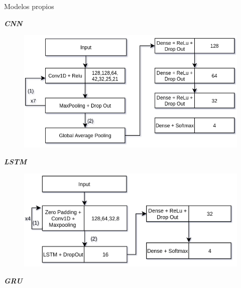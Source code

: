 \begin{frame}{Modelos propios}
\begin{overprint}
        \begin{center}
            {\color{TurkishRose} \textbf{\textit{CNN}}}
        \end{center}
        
        \begin{figure}
            \centering
            \includegraphics[keepaspectratio=true,height=0.65\paperheight,width=0.8\paperwidth]{Images/cnn diagram.png}
        \end{figure}
        
        \begin{center}
            {\color{TurkishRose} \textbf{\textit{LSTM}}}
        \end{center}    
        
        \begin{figure}
            \centering
            \includegraphics[keepaspectratio=true,height=0.65\paperheight,width=0.8\paperwidth]{Images/LSTM diagram.png}
        \end{figure}

            
        \begin{center}
            {\color{TurkishRose} \textbf{\textit{GRU}}}
        \end{center}


\end{overprint}
\end{frame}

